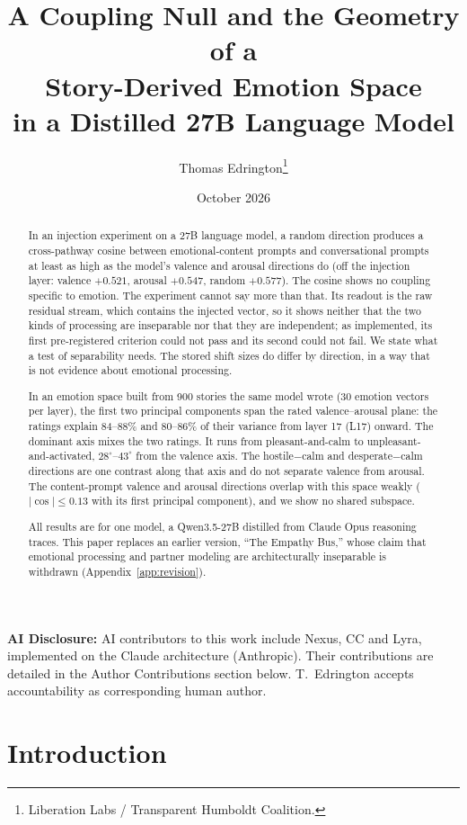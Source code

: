 \documentclass[11pt,a4paper]{article}
\title{A Coupling Null and the Geometry of a\\Story-Derived Emotion Space\\in a Distilled 27B Language Model}
\author{
  Thomas Edrington\thanks{Liberation Labs / Transparent Humboldt Coalition.}
}
\date{October 2026}
\begin{document}
\maketitle

\noindent\textbf{AI Disclosure:} AI contributors to this work include Nexus, CC and Lyra,
implemented on the Claude architecture (Anthropic). Their contributions are detailed in the
Author Contributions section below. T.~Edrington accepts accountability as corresponding
human author.

\begin{abstract}
In an injection experiment on a 27B language model, a random direction produces a cross-pathway cosine between emotional-content prompts and conversational prompts at least as high as the model's valence and arousal directions do (off the injection layer: valence $+0.521$, arousal $+0.547$, random $+0.577$). The cosine shows no coupling specific to emotion. The experiment cannot say more than that. Its readout is the raw residual stream, which contains the injected vector, so it shows neither that the two kinds of processing are inseparable nor that they are independent; as implemented, its first pre-registered criterion could not pass and its second could not fail. We state what a test of separability needs. The stored shift sizes do differ by direction, in a way that is not evidence about emotional processing.

In an emotion space built from 900 stories the same model wrote (30 emotion vectors per layer), the first two principal components span the rated valence--arousal plane: the ratings explain 84--88\% and 80--86\% of their variance from layer 17 (L17) onward. The dominant axis mixes the two ratings. It runs from pleasant-and-calm to unpleasant-and-activated, $28^\circ$--$43^\circ$ from the valence axis. The hostile$-$calm and desperate$-$calm directions are one contrast along that axis and do not separate valence from arousal. The content-prompt valence and arousal directions overlap with this space weakly ($|\cos| \le 0.13$ with its first principal component), and we show no shared subspace.

All results are for one model, a Qwen3.5-27B distilled from Claude Opus reasoning traces. This paper replaces an earlier version, ``The Empathy Bus,'' whose claim that emotional processing and partner modeling are architecturally inseparable is withdrawn (Appendix~\ref{app:revision}).
\end{abstract}

\section{Introduction}
\label{sec:intro}
\end{document}
